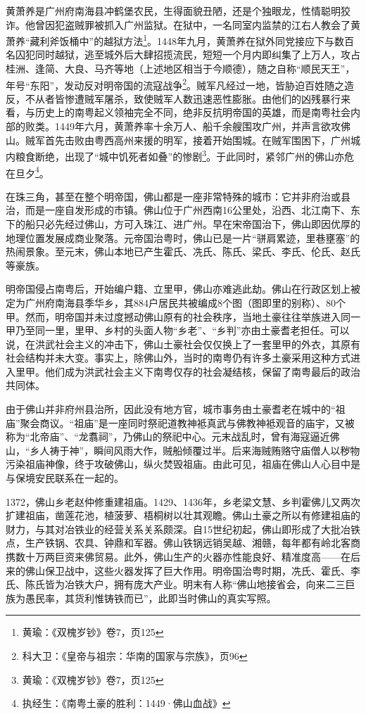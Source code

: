 黄萧养是广州府南海县冲鹤堡农民，生得面貌丑陋，还是个独眼龙，性情聪明狡诈。他曾因犯盗贼罪被抓入广州监狱。在狱中，一名同室内监禁的江右人教会了黄萧养“藏利斧饭桶中”的越狱方法\footnote{黄瑜：《双槐岁钞》卷7，页125}。1448年九月，黄萧养在狱外同党接应下与数百名囚犯同时越狱，逃至城外后大肆招揽流民，短短一个月内即纠集了上万人，攻占桂洲、逢简、大良、马齐等地（上述地区相当于今顺德），随之自称“顺民天王”，年号“东阳”，发动反对明帝国的流寇战争\footnote{科大卫：《皇帝与祖宗：华南的国家与宗族》，页96}。贼军凡经过一地，皆胁迫百姓随之造反，不从者皆惨遭贼军屠杀，致使贼军人数迅速恶性膨胀。由他们的凶残暴行来看，与历史上的南粤起义领袖完全不同，绝非反抗明帝国的英雄，而是南粤社会内部的败类。1449年六月，黄萧养率十余万人、船千余艘围攻广州，并声言欲攻佛山。贼军首先击败由粤西高州来援的明军，接着开始围城。在贼军围困下，广州城内粮食断绝，出现了“城中饥死者如叠”的惨剧\footnote{黄瑜：《双槐岁钞》卷7，页125}。于此同时，紧邻广州的佛山亦危在旦夕\footnote{执经生：《南粤土豪的胜利：1449·佛山血战》}。

在珠三角，甚至在整个明帝国，佛山都是一座非常特殊的城市：它并非府治或县治，而是一座自发形成的市镇。佛山位于广州西南16公里处，沿西、北江南下、东下的船只必先经过佛山，方可入珠江、进广州。早在宋帝国治下，佛山即因优厚的地理位置发展成商业聚落。元帝国治粤时，佛山已是一片“骈肩累迹，里巷壅塞”的热闹景象。至元末，佛山本地已产生霍氏、冼氏、陈氏、梁氏、李氏、伦氏、赵氏等豪族。

明帝国侵占南粤后，开始编户籍、立里甲，佛山亦难逃此劫。佛山在行政区划上被定为广州府南海县季华乡，其884户居民共被编成8个图（图即里的别称）、80个甲。然而，明帝国并未过度撼动佛山原有的社会秩序，当地土豪往往举族进入同一甲乃至同一里，里甲、乡村的头面人物“乡老”、“乡判”亦由土豪耆老担任。可以说，在洪武社会主义的冲击下，佛山土豪社会仅仅换上了一套里甲的外衣，其原有社会结构并未大变。事实上，除佛山外，当时的南粤仍有许多土豪采用这种方式进入里甲。他们成为洪武社会主义下南粤仅存的社会凝结核，保留了南粤最后的政治共同体。

由于佛山并非府州县治所，因此没有地方官，城市事务由土豪耆老在城中的“祖庙”聚会商议。“祖庙”是一座同时祭祀道教神袛真武与佛教神袛观音的庙宇，又被称为“北帝庙”、“龙翥祠”，乃佛山的祭祀中心。元末战乱时，曾有海寇逼近佛山，“乡人祷于神”，瞬间风雨大作，贼船倾覆过半。后来海贼贿赂守庙僧人以秽物污染祖庙神像，终于攻破佛山，纵火焚毁祖庙。由此可见，祖庙在佛山人心目中是与保境安民联系在一起的。

1372，佛山乡老赵仲修重建祖庙。1429、1436年，乡老梁文慧、乡判霍佛儿又两次扩建祖庙，凿莲花池，植菠萝、梧桐树以壮其观瞻。佛山土豪之所以有修建祖庙的财力，与其对冶铁业的经营关系关系颇深。自15世纪初起，佛山即形成了大批冶铁点，生产铁锅、农具、钟鼎和军器。佛山铁锅远销吴越、湘赣，每年都有岭北客商携数十万两巨资来佛贸易。此外，佛山生产的火器亦性能良好、精准度高——在后来的佛山保卫战中，这些火器发挥了巨大作用。明帝国治粤时期，冼氏、霍氏、李氏、陈氏皆为冶铁大户，拥有庞大产业。明末有人称“佛山地接省会，向来二三巨族为愚民率，其货利惟铸铁而已”，此即当时佛山的真实写照。

